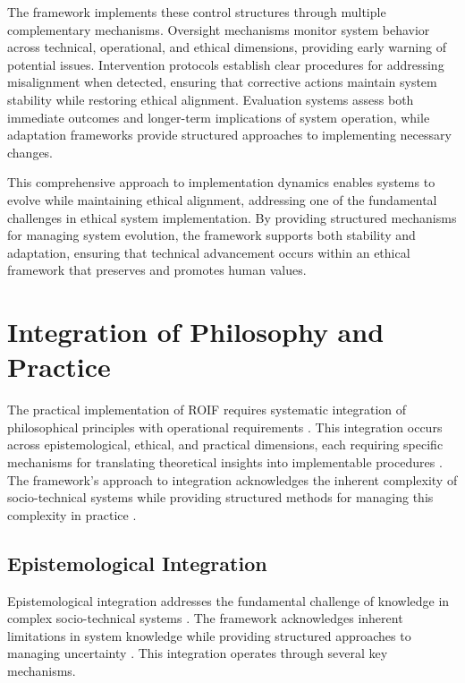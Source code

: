 \documentclass[12pt]{article}
\begin{document}
The framework implements these control structures through multiple complementary mechanisms. Oversight mechanisms monitor system behavior across technical, operational, and ethical dimensions, providing early warning of potential issues. Intervention protocols establish clear procedures for addressing misalignment when detected, ensuring that corrective actions maintain system stability while restoring ethical alignment. Evaluation systems assess both immediate outcomes and longer-term implications of system operation, while adaptation frameworks provide structured approaches to implementing necessary changes.

This comprehensive approach to implementation dynamics enables systems to evolve while maintaining ethical alignment, addressing one of the fundamental challenges in ethical system implementation. By providing structured mechanisms for managing system evolution, the framework supports both stability and adaptation, ensuring that technical advancement occurs within an ethical framework that preserves and promotes human values.

\section{Integration of Philosophy and Practice}

The practical implementation of ROIF requires systematic integration of philosophical principles with operational requirements \parencite{rouse2002}. This integration occurs across epistemological, ethical, and practical dimensions, each requiring specific mechanisms for translating theoretical insights into implementable procedures \parencite{wimsatt2007}. The framework's approach to integration acknowledges the inherent complexity of socio-technical systems while providing structured methods for managing this complexity in practice \parencite{pickering1995}.

\subsection{Epistemological Integration}

Epistemological integration addresses the fundamental challenge of knowledge in complex socio-technical systems \parencite{jasanoff2004}. The framework acknowledges inherent limitations in system knowledge while providing structured approaches to managing uncertainty \parencite{giere2006}. This integration operates through several key mechanisms.
\end{document}
